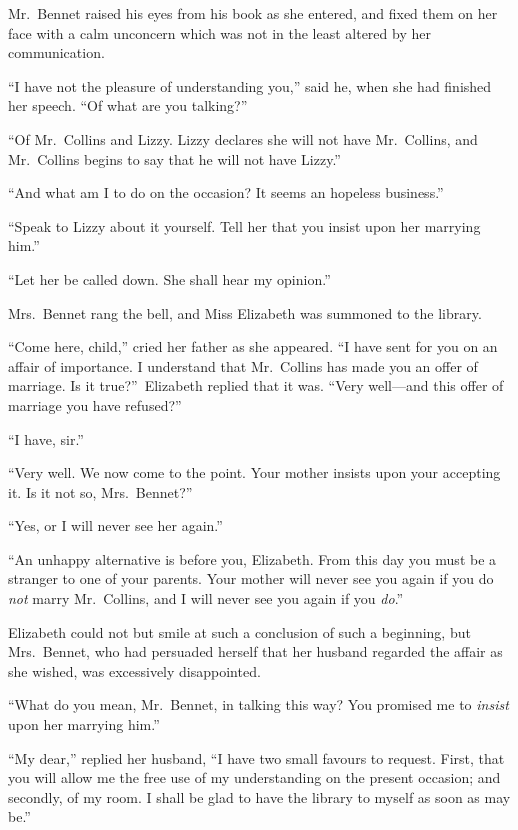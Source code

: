 \documentclass[12pt,english]{book}
\begin{document}
Mr.\ Bennet raised his eyes from his book as she entered, and fixed
them on her face with a calm unconcern which was not in the least
altered by her communication.

{}``I have not the pleasure of understanding you,'' said he, when
she had finished her speech. {}``Of what are you talking?''\ 

{}``Of Mr.\ Collins and Lizzy. Lizzy declares she will not have
Mr.\ Collins, and Mr.\ Collins begins to say that he will not have
Lizzy.''

{}``And what am I to do on the occasion? It seems an hopeless business.''

{}``Speak to Lizzy about it yourself. Tell her that you insist upon
her marrying him.''

{}``Let her be called down. She shall hear my opinion.''

Mrs.\ Bennet rang the bell, and Miss Elizabeth was summoned to the
library.

{}``Come here, child,'' cried her father as she appeared. {}``I
have sent for you on an affair of importance. I understand that Mr.\ 
Collins has made you an offer of marriage. Is it true?''\ Elizabeth
replied that it was. {}``Very well\mbox{---}and this offer of marriage
you have refused?''\ 

{}``I have, sir.''

{}``Very well. We now come to the point. Your mother insists upon
your accepting it. Is it not so, Mrs.\ Bennet?''\ 

{}``Yes, or I will never see her again.''

{}``An unhappy alternative is before you, Elizabeth. From this day
you must be a stranger to one of your parents. Your mother will never
see you again if you do \textit{not} marry Mr.\ Collins, and I will
never see you again if you \textit{do}.''

Elizabeth could not but smile at such a conclusion of such a beginning,
but Mrs.\ Bennet, who had persuaded herself that her husband regarded
the affair as she wished, was excessively disappointed.

{}``What do you mean, Mr.\ Bennet, in talking this way? You promised
me to \textit{insist} upon her marrying him.''

{}``My dear,'' replied her husband, {}``I have two small favours
to request. First, that you will allow me the free use of my understanding
on the present occasion; and secondly, of my room. I shall be glad
to have the library to myself as soon as may be.''
\end{document}
